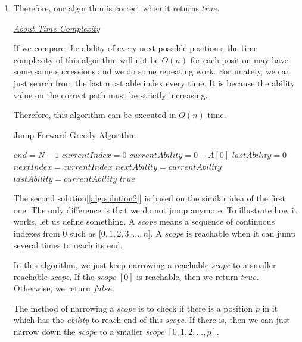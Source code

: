 \documentclass[12pt,a4paper]{article}
\makeatletter
\newtheorem*{solution}{Solution}
\renewenvironment{solution}[1][Solution] {\par\pushQED{\qed}\normalfont\topsep6\p@\@plus6\p@\relax\trivlist\item[\hskip\labelsep\bfseries#1\@addpunct{.}]\ignorespaces}{\popQED\endtrivlist\@endpefalse} \makeatother
\makeatother
\begin{document}
\begin{enumerate}
\begin{solution}
Therefore, our algorithm is correct when it returns $true$. 
\setlength\parindent{0em}

\emph{\underline{About Time Complexity}}


If we compare the ability of every next possible positions, the time complexity of this algorithm will not be $O(n)$ for each position may have some same successions and we do some repeating work.
Fortunately, we can just search from the last most able index every time. It is because the ability value on the correct path must be strictly increasing. 

Therefore, this algorithm can be executed in $O(n)$  time.





\begin{algorithm} 
  \label{alg:solution1}
  \caption{Jump-Forward-Greedy Algorithm} 

  $end = N-1$\; 
  $currentIndex = 0$\;
  $currentAbility = 0 + A[0]$\; 
  $lastAbility = 0$\;  
  { 
  	$nextIndex = currentIndex$\;
  	$nextAbility = currentAbility$\;
  	$lastAbility = currentAbility$\;
  } 
  \Return $true$\; 
\end{algorithm}



The second solution[\ref{alg:solution2}] is based on the similar idea of the first one. The only difference is that we do not jump anymore. To illustrate how it works, let us define something. A \emph{scope} means a sequence of continuous indexes from 0 such as [$0,1,2,3,...,n$]. A \emph{scope} is reachable when it can jump several times to reach its end. 

In this algorithm, we just keep narrowing a reachable \emph{scope} to a smaller reachable \emph{scope}. If the \emph{scope} $[0]$ is reachable, then we return $true$. Otherwise, we return $false$.

The method of narrowing a \emph{scope} is to check if there is a position $p$ in it which has the \emph{ability} to reach end of this \emph{scope}. If there is, then we can just narrow down the \emph{scope} to a smaller \emph{scope} $[0,1,2,...,p]$.


\end{solution}
\end{enumerate}
\end{document}
